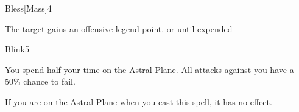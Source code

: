 \begin{spellsection}{Bless}[Mass]{4}
    \begin{spellheader}
    \end{spellheader}
    \begin{spellcontent}
        \begin{spelltargetinginfo}
        \end{spelltargetinginfo}
        \begin{spelleffects}
            \spelleffect The target gains an offensive legend point.
            \spelldur \durshort or until expended
        \end{spelleffects}
    \end{spellcontent}
    \begin{spellfooter}
        \miscastexplode
    \end{spellfooter}
\end{spellsection}

\begin{spellsection}{Blink}{5}
    \begin{spellheader}
    \end{spellheader}
    \begin{spellcontent}
        \begin{spelltargetinginfo}
        \end{spelltargetinginfo}
        \begin{spelleffects}
            \spelleffect You spend half your time on the Astral Plane. All attacks against you have a 50\% chance to fail.
            \spelldur \durshort \dismissable
        \end{spelleffects}
    \end{spellcontent}
    \begin{spellfooter}
        \spellnotes If you are on the Astral Plane when you cast this spell, it has no effect.
        \miscastexplode
    \end{spellfooter}
\end{spellsection}

